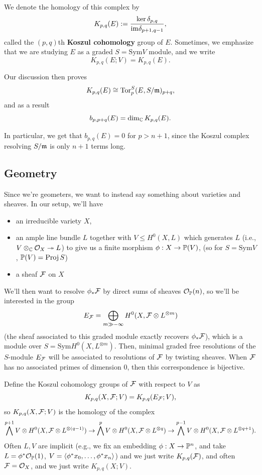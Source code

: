 \documentclass[12pt]{article}
\newcommand{\Sym}{\mathrm{Sym}}
\newcommand{\Tor}{\mathrm{Tor}}
\begin{document}
\begin{defn}
    We denote the homology of this complex by
    \[K_{p,q}(E) := \frac{\ker \delta_{p,q}}{\mathrm{im} \delta_{p+1,q-1}},\]
    called the $(p,q)$th \textbf{Koszul cohomology} group of $E$. Sometimes, we emphasize that we are studying $E$ as a graded $S=\Sym V$ module, and we write
    \[K_{p,q}(E;V) = K_{p,q}(E).\]
\end{defn}

Our discussion then proves
\[K_{p,q}(E) \cong \Tor_p^S(E,S/\fm)_{p+q},\]
and as a result
\[b_{p,p+q}(E) = \dim_{\mathbb{C}} K_{p,q}(E).\]

In particular, we get that $b_{p,q}(E)=0$ for $p>n+1$, since the Koszul complex resolving $S/\mathfrak{m}$ is only $n+1$ terms long.


\subsection{Geometry}

Since we're geometers, we want to instead say something about varieties and sheaves. In our setup, we'll have
\begin{itemize}
    \item an irreducible variety $X$,
    \item an ample line bundle $L$ together with $V\leq H^0(X,L)$ which generates $L$ (i.e., $V\otimes_{\mathbb{C}} \mathcal{O}_X \twoheadrightarrow L$) to give us a finite morphism $\phi: X\to \P(V)$, (so for $S=\Sym V$, $\mathbb{P}(V)=\operatorname{Proj} S$)
    \item a sheaf $\mathcal{F}$ on $X$
\end{itemize}
We'll then want to resolve $\phi_* \cF$ by direct sums of sheaves $\mathcal{O}_{\mathbb{P}}(n)$, so we'll be interested in the group
\[E_{\mathcal{F}} = \bigoplus_{m\gg -\infty} H^0(X,\mathcal{F}\otimes L^{\otimes m})\]
(the sheaf associated to this graded module exactly recovers $\phi_* \cF$), which is a module over $S= \Sym H^0(X,L^{\otimes m})$. Then, minimal graded free resolutions of the $S$-module $E_{\mathcal{F}}$ will be associated to resolutions of $\mathcal{F}$ by twisting sheaves. When $\mathcal{F}$ has no associated primes of dimension 0, then this correspondence is bijective.

\begin{defn}
    Define the Koszul cohomology groups of $\mathcal{F}$ with respect to $V$ as
    \[K_{p,q}(X,\mathcal{F}; V) = K_{p,q}(E_{\mathcal{F}}; V),\]
    so $K_{p,q}(X,\mathcal{F}; V)$ is the homology of the complex
    \[\bigwedge^{p+1} V \otimes H^0(X,\mathcal{F}\otimes L^{\otimes (q-1)}) \to \bigwedge^p V \otimes H^0(X,\mathcal{F}\otimes L^{\otimes q}) \to \bigwedge^{p-1} V \otimes H^0(X,\mathcal{F}\otimes L^{\otimes q+1}).\]
    Often $L,V$ are implicit (e.g., we fix an embedding $\phi: X\to \P^n$, and take $L=\phi^*\cO_\P(1)$, $V=\<\phi^*x_0,\dots,\phi^*x_n\>$) and we just write $K_{p,q}(\mathcal{F})$, and often $\mathcal{F}=\mathcal{O}_X$, and we just write $K_{p,q}(X;V)$.
\end{defn}
\end{document}
